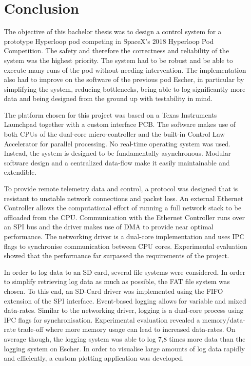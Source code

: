\chapter{Conclusion}


The objective of this bachelor thesis was to design a control system for a prototype Hyperloop pod competing in SpaceX's 2018 Hyperloop Pod Competition. The safety and therefore the correctness and reliability of the system was the highest priority. The system had to be robust and be able to execute many runs of the pod without needing intervention. The implementation also had to improve on the software of the previous pod Escher, in particular by simplifying the system, reducing bottlenecks, being able to log significantly more data and being designed from the ground up with testability in mind.


The platform chosen for this project was based on a Texas Instruments Launchpad together with a custom interface PCB. The software makes use of both CPUs of the dual-core micro-controller and the built-in Control Law Accelerator for parallel processing. No real-time operating system was used. Instead, the system is designed to be fundamentally asynchronous. Modular software design and a centralized data-flow make it easily maintainable and extendible.


To provide remote telemetry data and control, a protocol was designed that is resistant to unstable network connections and packet loss. An external Ethernet Controller allows the computational effort of running a full network stack to be offloaded from the CPU. Communication with the Ethernet Controller runs over an SPI bus and the driver makes use of DMA to provide near optimal performance. The networking driver is a dual-core implementation and uses IPC flags to synchronise communication between CPU cores. Experimental evaluation showed that the performance far surpassed the requirements of the project.


In order to log data to an SD card, several file systems were considered. In order to simplify retrieving log data as much as possible, the FAT file system was chosen. To this end, an SD-Card driver was implemented using the FIFO extension of the SPI interface. Event-based logging allows for variable and mixed data-rates. Similar to the networking driver, logging is a dual-core process using IPC flags for synchronisation. Experimental evaluation revealed a memory/data-rate trade-off where more memory usage can lead to increased data-rates. On average though, the logging system was able to log 7,8 times more data than the logging system on Escher. In order to visualise large amounts of log data rapidly and efficiently, a custom plotting application was developed.

